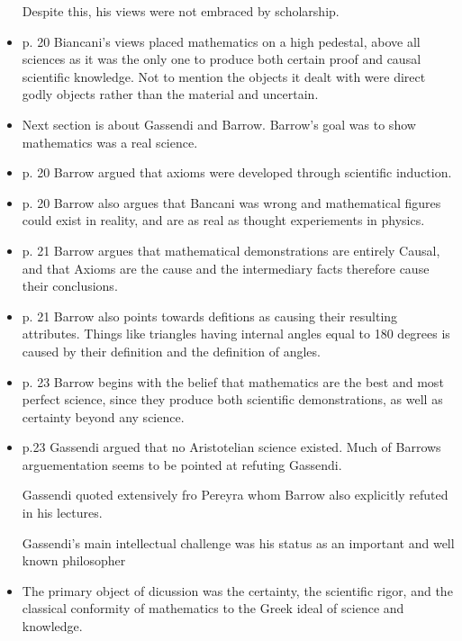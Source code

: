 \documentclass{report}
\begin{document}
\begin{itemize}
        Despite this, his views were not embraced by scholarship.
    \item p. 20 Biancani's views placed mathematics on a high
        pedestal, above all sciences as it was the only one
        to produce both certain proof and causal scientific
        knowledge. Not to mention the objects it dealt with
        were direct godly objects rather than the material
        and uncertain.
    \item Next section is about Gassendi and Barrow. Barrow's
        goal was to show mathematics was a real science.
    \item p. 20 Barrow argued that axioms were developed
        through scientific induction.
    \item p. 20 Barrow also argues that Bancani was wrong and
        mathematical figures could exist in reality, and
        are as real as thought experiements in physics.
    \item p. 21 Barrow argues that mathematical demonstrations
        are entirely Causal, and that Axioms are the cause
        and the intermediary facts therefore cause their
        conclusions.
    \item p. 21 Barrow also points towards defitions as
        causing their resulting attributes. Things like
        triangles having internal angles equal to 180 degrees
        is caused by their definition and the definition of
        angles.
    \item p. 23 Barrow begins with the belief that mathematics
        are the best and most perfect science, since
        they produce both scientific demonstrations, as well
        as certainty beyond any science.
    \item p.23 Gassendi argued that no Aristotelian science
        existed. Much of Barrows arguementation seems
        to be pointed at refuting Gassendi.
        \begin{mdframed}
            Gassendi quoted extensively fro Pereyra
            whom Barrow also explicitly refuted
            in his lectures. 

            Gassendi's main intellectual challenge was
            his status as an important and well known
            philosopher
        \end{mdframed}
    \item The primary object of dicussion was the certainty,
        the scientific rigor, and the classical
        conformity of mathematics to the Greek ideal
        of science and knowledge.
\end{itemize}
\end{document}
